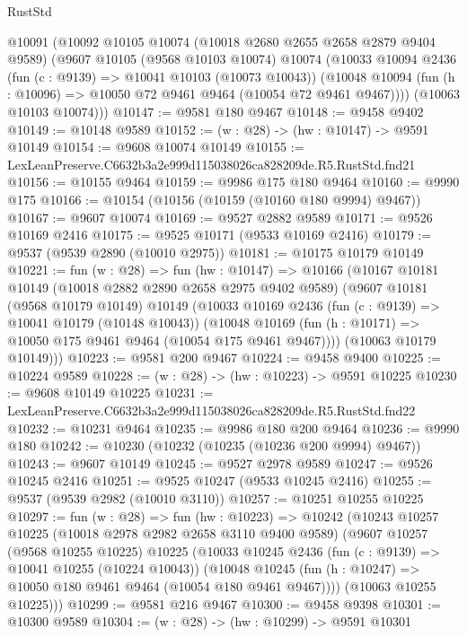 \begin{lexlean}{RustStd}
\begin{coremodule}
  @10091
    (@10092
      @10105
      @10074
      (@10018 @2680 @2655 @2658 @2879 @9404 @9589)
      (@9607
        @10105
        (@9568 @10103 @10074)
        @10074
        (@10033
          @10094
          @2436
          (fun (c : @9139) => @10041 @10103 (@10073 @10043))
          (@10048 @10094 (fun (h : @10096) => @10050 @72 @9461 @9464 (@10054 @72 @9461 @9467))))
        (@10063 @10103 @10074)))
@10147 := @9581 @180 @9467
@10148 := @9458 @9402
@10149 := @10148 @9589
@10152 := (w : @28) -> (hw : @10147) -> @9591 @10149
@10154 := @9608 @10074 @10149
@10155 := LexLeanPreserve.C6632b3a2e999d115038026ca828209de.R5.RustStd.fnd21
@10156 := @10155 @9464
@10159 := @9986 @175 @180 @9464
@10160 := @9990 @175
@10166 := @10154 (@10156 (@10159 (@10160 @180 @9994) @9467))
@10167 := @9607 @10074
@10169 := @9527 @2882 @9589
@10171 := @9526 @10169 @2416
@10175 := @9525 @10171 (@9533 @10169 @2416)
@10179 := @9537 (@9539 @2890 (@10010 @2975))
@10181 := @10175 @10179 @10149
@10221 := fun (w : @28) =>
  fun (hw : @10147) =>
  @10166
    (@10167
      @10181
      @10149
      (@10018 @2882 @2890 @2658 @2975 @9402 @9589)
      (@9607
        @10181
        (@9568 @10179 @10149)
        @10149
        (@10033
          @10169
          @2436
          (fun (c : @9139) => @10041 @10179 (@10148 @10043))
          (@10048 @10169 (fun (h : @10171) => @10050 @175 @9461 @9464 (@10054 @175 @9461 @9467))))
        (@10063 @10179 @10149)))
@10223 := @9581 @200 @9467
@10224 := @9458 @9400
@10225 := @10224 @9589
@10228 := (w : @28) -> (hw : @10223) -> @9591 @10225
@10230 := @9608 @10149 @10225
@10231 := LexLeanPreserve.C6632b3a2e999d115038026ca828209de.R5.RustStd.fnd22
@10232 := @10231 @9464
@10235 := @9986 @180 @200 @9464
@10236 := @9990 @180
@10242 := @10230 (@10232 (@10235 (@10236 @200 @9994) @9467))
@10243 := @9607 @10149
@10245 := @9527 @2978 @9589
@10247 := @9526 @10245 @2416
@10251 := @9525 @10247 (@9533 @10245 @2416)
@10255 := @9537 (@9539 @2982 (@10010 @3110))
@10257 := @10251 @10255 @10225
@10297 := fun (w : @28) =>
  fun (hw : @10223) =>
  @10242
    (@10243
      @10257
      @10225
      (@10018 @2978 @2982 @2658 @3110 @9400 @9589)
      (@9607
        @10257
        (@9568 @10255 @10225)
        @10225
        (@10033
          @10245
          @2436
          (fun (c : @9139) => @10041 @10255 (@10224 @10043))
          (@10048 @10245 (fun (h : @10247) => @10050 @180 @9461 @9464 (@10054 @180 @9461 @9467))))
        (@10063 @10255 @10225)))
@10299 := @9581 @216 @9467
@10300 := @9458 @9398
@10301 := @10300 @9589
@10304 := (w : @28) -> (hw : @10299) -> @9591 @10301

\end{coremodule}
\end{lexlean}
